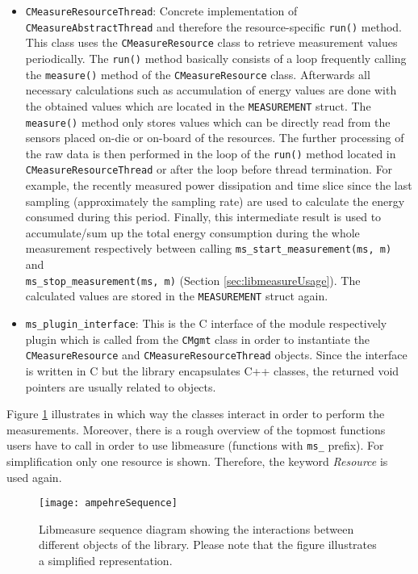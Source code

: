 \begin{description}
\begin{itemize}
		\item \texttt{CMeasureResourceThread}: Concrete implementation of\\ 
		\texttt{CMeasureAbstractThread} and therefore the resource-specific \texttt{run()} method. This class uses the \texttt{CMeasureResource} class to retrieve measurement values periodically. The \texttt{run()} method basically consists of a loop frequently calling the \texttt{measure()} method of the \texttt{CMeasureResource} class. Afterwards all necessary calculations such as accumulation of energy values are done with the obtained values which are located in the \texttt{MEASUREMENT} struct. The \texttt{measure()} method only stores values which can be directly read from the sensors placed on-die or on-board of the resources. The further processing of the raw data is then performed in the loop of the \texttt{run()} method located in \texttt{CMeasureResourceThread} or after the loop before thread termination. For example, the recently measured power dissipation and time slice since the last sampling (approximately the sampling rate) are used to calculate the energy consumed during this period. Finally, this intermediate result is used to accumulate/sum up the total energy consumption during the whole measurement respectively between calling \texttt{ms\_start\_measurement(ms, m)} and \\\texttt{ms\_stop\_measurement(ms, m)} (Section \ref{sec:libmeasureUsage}). The calculated values are stored in the \texttt{MEASUREMENT} struct again.	
		\item \texttt{ms\_plugin\_interface}: This is the C interface of the module respectively plugin which is called from the \texttt{CMgmt} class in order to instantiate the \texttt{CMeasureResource} and \texttt{CMeasureResourceThread} objects. Since the interface is written in C but the library encapsulates C++ classes, the returned void pointers are usually related to objects.
	\end{itemize}
\end{description}

Figure \ref{fig:libmeasureSequence} illustrates in which way the classes interact in order to perform the measurements. Moreover, there is a rough overview of the topmost functions users have to call in order to use libmeasure (functions with \texttt{ms\_} prefix). For simplification only one resource is shown. Therefore, the keyword \textit{Resource} is used again.\\

\begin{figure}
\begin{center}
\texttt{[image: ampehreSequence]} 
\caption{Libmeasure sequence diagram showing the interactions between different objects of the library. Please note that the figure illustrates a simplified representation.}
\label{fig:libmeasureSequence}
\end{center}
\end{figure}

